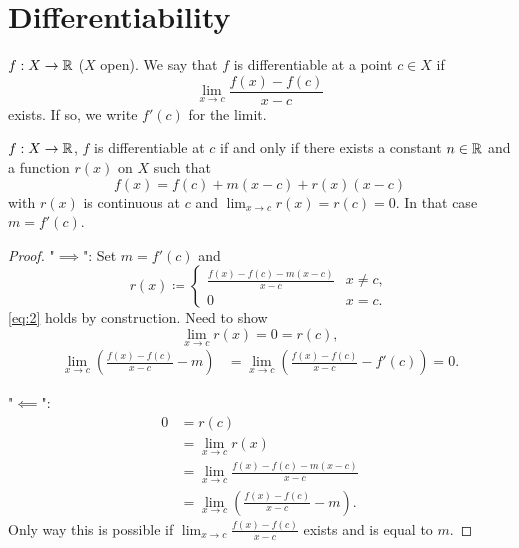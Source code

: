 \chapter{Differentiability}\label{cha:differentiability}

\begin{definition}\label{def:differentiable}
    $f : X \to \mathbb{R}$
    ($X$ open).
    We say that $f$ is differentiable at a point $c \in X$ if
    \[
    \lim_{x \to c}\frac{f(x) - f(c)}{x - c}
    \]
    exists.
    If so,
    we write $f'(c)$ for the limit.
\end{definition}

\begin{lemma}\label{lem:firstordertaylor}
    $f : X \to \mathbb{R}$,
    $f$ is differentiable at $c$ if and only if there exists a constant $n \in \mathbb{R}$ and a function $r(x)$ on $X$ such that
    \begin{equation}\label{eq:2}
        f(x) = f(c) + m(x - c) + r(x)(x - c)
    \end{equation}
    with $r(x)$ is continuous at $c$ and $\lim_{x \to c} r(x) = r(c) = 0$.
    In that case $m = f'(c)$.
\end{lemma}
\begin{proof}
    "$\implies$":
    Set $m = f'(c)$ and
    \[
    r(x) \coloneqq \begin{cases}
        \frac{f(x) - f(c) - m(x - c)}{x - c} & x \neq c, \\
        0 & x = c.
    \end{cases}
    \]
    \eqref{eq:2} holds by construction.
    Need to show
    \[
    \lim_{x \to c}r(x) = 0 = r(c),
    \]
    \begin{align*}
        \lim_{x \to c}\left(\frac{f(x) - f(c)}{x - c} - m\right) &= \lim_{x \to c}\left(\frac{f(x) - f(c)}{x - c} - f'(c)\right) = 0.
    \end{align*}

    "$\impliedby$":
    \begin{align*}
        0 &= r(c) \\
        &= \lim_{x \to c}r(x) \\
        &= \lim_{x \to c}\frac{f(x) - f(c) - m(x - c)}{x - c} \\
        &= \lim_{x \to c}\left(\frac{f(x) - f(c)}{x - c} - m\right).
    \end{align*}
    Only way this is possible if $\lim_{x \to c}\frac{f(x) - f(c)}{x - c}$ exists and is equal to $m$.
\end{proof}

